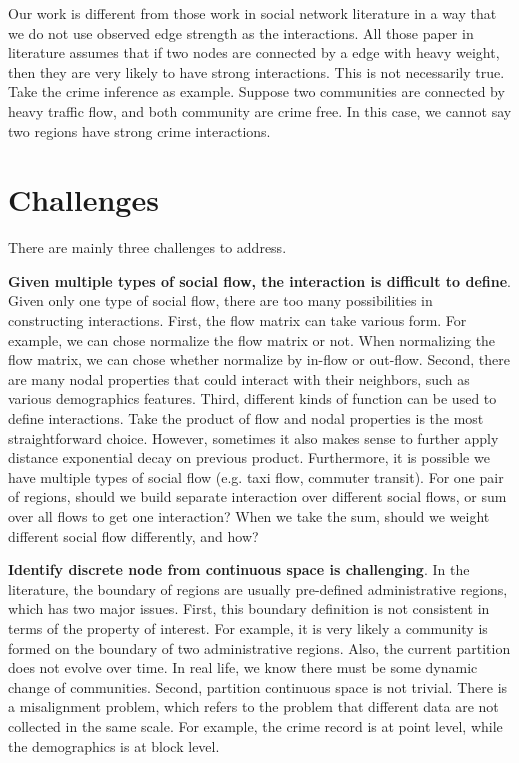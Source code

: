 Our work is different from those work in social network literature in a way that we do not use observed edge strength as the interactions. All those paper in literature assumes that if two nodes are connected by a edge with heavy weight, then they are very likely to have strong interactions. This is not necessarily true. Take the crime inference as example. Suppose two communities are connected by heavy traffic flow, and both community are crime free. In this case, we cannot say two regions have strong crime interactions.







\section{Challenges}

There are mainly three challenges to address.

\textbf{Given multiple types of social flow, the interaction is difficult to define}. Given only one type of social flow, there are too many possibilities in constructing interactions.  First, the flow matrix can take various form. For example, we can chose normalize the flow matrix or not. When normalizing the flow matrix, we can chose whether normalize by in-flow or out-flow. Second, there are many nodal properties that could interact with their neighbors, such as various demographics features. Third, different kinds of function can be used to define interactions. Take the product of flow and nodal properties is the most straightforward choice. However, sometimes it also makes sense to further apply distance exponential decay on previous product.  Furthermore, it is possible we have multiple types of social flow (e.g. taxi flow, commuter transit). For one pair of regions, should we build separate interaction over different social flows, or sum over all flows to get one interaction? When we take the sum, should we weight different social flow differently, and how?



\textbf{Identify discrete node from continuous space is challenging}. In the literature, the boundary of regions are usually pre-defined administrative regions, which has two major issues. First, this boundary definition is not consistent in terms of the property of interest. For example, it is very likely a community is formed on the boundary of two administrative regions. Also, the current partition does not evolve over time. In real life, we know there must be some dynamic change of communities. Second, partition continuous space is not trivial. There is a misalignment problem, which refers to the problem that different data are not collected in the same scale. For example, the crime record is at point level, while the demographics is at block level.



